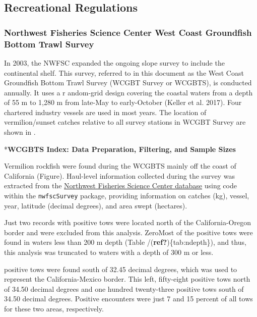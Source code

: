 \documentclass[
  english,
  a4paper,
]{article}
\begin{document}
\clearpage

\hypertarget{regs-graphic}{%
\subsection{Recreational Regulations}\label{regs-graphic}}

\hypertarget{northwest-fisheries-science-center-west-coast-groundfish-bottom-trawl-survey-1}{%
\subsubsection{Northwest Fisheries Science Center West Coast Groundfish Bottom Trawl Survey}\label{northwest-fisheries-science-center-west-coast-groundfish-bottom-trawl-survey-1}}

In 2003, the NWFSC expanded the ongoing slope survey to include the continental
shelf. This survey, referred to in this document as the West Coast Groundfish
Bottom Trawl Survey (WCGBT Survey or WCGBTS), is conducted annually. It uses a r
andom-grid design covering the coastal waters from a depth of 55 m to 1,280 m
from late-May to early-October (Keller et al. 2017). Four chartered industry vessels
are used in most years. The location of vermilion/sunset catches relative to all
survey stations in WCGBT Survey are shown in .

*\textbf{WCGBTS Index: Data Preparation, Filtering, and Sample Sizes}

Vermilion rockfish were found during the WCGBTS mainly off the coast of
California (Figure). Haul-level information collected during the
survey was extracted from the
\href{https://www.webapps.nwfsc.noaa.gov/data}{Northwest Fisheries Science Center database}
using code within the \texttt{nwfscSurvey} package, providing information on
catches (kg),
vessel,
year,
latitude (decimal degrees), and
area swept (hectares).

Just
two
records with positive tows were located north of the California-Oregon border
and were excluded from this analysis.
ZeroMost of the positive tows were found in waters less than 200 m depth
(Table /(\textbf{ref?})\{tab:ndepth\}), and thus,
this analysis was truncated to waters with a depth of 300 m or less.

positive tows were found south of 32.45 decimal degrees,
which was used to represent the California-Mexico border.
This left,
fifty-eight
positive tows north of 34.50 decimal degrees and
one hundred twenty-three
positive tows south of 34.50 decimal degrees.
Positive encounters were just
7 and 15
percent of all tows for these two areas, respectively.
\end{document}
